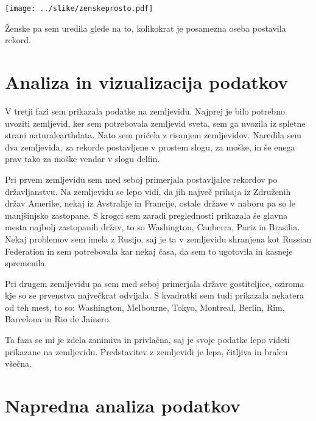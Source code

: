 \documentclass[11pt,a4paper]{article}
\begin{document}
\texttt{[image: ../slike/zenskeprosto.pdf]}

Ženske pa sem uredila glede na to, kolikokrat je posamezna oseba postavila rekord.
\section{Analiza in vizualizacija podatkov}

V tretji fazi sem prikazala podatke na zemljevidu. Najprej je bilo potrebno uvoziti zemljevid, ker sem potrebovala zemljevid sveta, sem ga uvozila iz spletne strani naturalearthdata. Nato sem pričela z risanjem zemljevidov. Naredila sem dva zemljevida, za rekorde postavljene v prostem slogu, za moške, in še enega prav tako za moške vendar v slogu delfin. 



Pri prvem zemljevidu sem med seboj primerjala postavljalce rekordov po državljanstvu. Na zemljevidu se lepo vidi, da jih največ prihaja iz Združenih držav Amerike, nekaj iz Avstralije in Francije, ostale države v naboru pa so le manjšinjsko zastopane. S krogci sem zaradi preglednosti prikazala še glavna mesta najbolj zastopanih držav, to so Washington, Canberra, Pariz in Brasilia. Nekaj problemov sem imela z Rusijo, saj je ta v zemljevidu shranjena kot Russian Federation in sem potrebovala kar nekaj časa, da sem to ugotovila in kasneje spremenila. 


Pri drugem zemljevidu pa sem med seboj primerjala države gostiteljice, oziroma kje so se prvenstva največkrat odvijala. S kvadratki sem tudi prikazala nekatera od teh mest, to so: Washington, Melbourne, Tokyo, Montreal, Berlin, Rim, Barcelona in Rio de Jainero. 

Ta faza se mi je zdela zanimiva in privlačna, saj je svoje podatke lepo videti prikazane na zemljevidu. Predstavitev z zemljevidi je lepa, čitljiva in bralcu všečna. 

\section{Napredna analiza podatkov}
\end{document}

